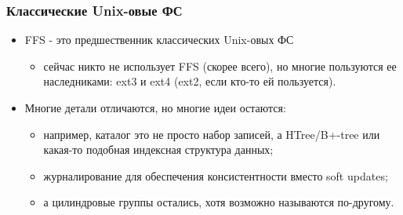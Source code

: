 \begin{frame}
\frametitle{Классические Unix-овые ФС}
\begin{itemize}
  \item FFS - это предшественник классических Unix-овых ФС
  \begin{itemize}
    \item сейчас никто не использует FFS (скорее всего), но многие пользуются
    ее наследниками: ext3 и ext4 (ext2, если кто-то ей пользуется).
  \end{itemize}
  \item Многие детали отличаются, но многие идеи остаются:
  \begin{itemize}
    \item например, каталог это не просто набор записей, а HTree/B+-tree или
    какая-то подобная индексная структура данных;
    \item журналирование для обеспечения консистентности вместо soft updates;
    \item а цилиндровые группы остались, хотя возможно называются по-другому.
  \end{itemize}
\end{itemize}
\end{frame}
